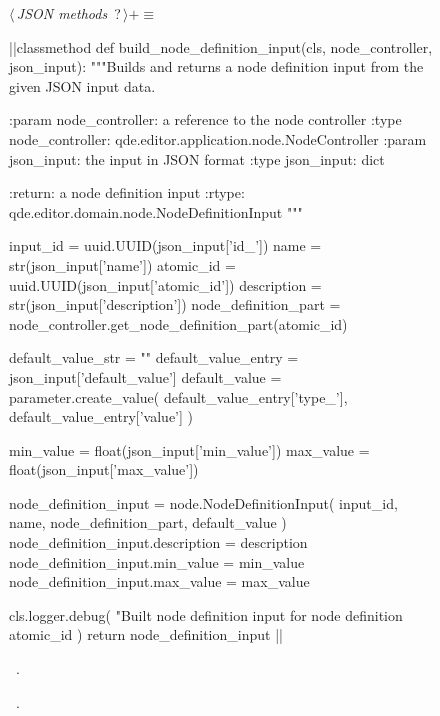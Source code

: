\documentclass[%
    a4paper,    %
    justified,  %
    nobib,      %
    openany     %
]{tufte-book}
\begin{document}
\begin{figure}
\begin{flushleft} \small
\begin{minipage}{\linewidth}\label{scrap127}\raggedright\small
{} $\langle\,${\itshape JSON methods}\nobreak\ {\footnotesize {?}}$\,\rangle+\equiv$
\vspace{-1ex}
\begin{pythoncode}
|\normalfont{}\fontfamily{}|classmethod
def build_node_definition_input(cls, node_controller, json_input):
    """Builds and returns a node definition input from the given JSON input
    data.

    :param node_controller: a reference to the node controller
    :type  node_controller: qde.editor.application.node.NodeController
    :param json_input: the input in JSON format
    :type  json_input: dict

    :return: a node definition input
    :rtype:  qde.editor.domain.node.NodeDefinitionInput
    """

    input_id             = uuid.UUID(json_input['id_'])
    name                 = str(json_input['name'])
    atomic_id            = uuid.UUID(json_input['atomic_id'])
    description          = str(json_input['description'])
    node_definition_part = node_controller.get_node_definition_part(atomic_id)

    default_value_str = ""
    default_value_entry = json_input['default_value']
    default_value = parameter.create_value(
        default_value_entry['type_'],
        default_value_entry['value']
    )

    min_value = float(json_input['min_value'])
    max_value = float(json_input['max_value'])

    node_definition_input = node.NodeDefinitionInput(
        input_id,
        name,
        node_definition_part,
        default_value
    )
    node_definition_input.description = description
    node_definition_input.min_value = min_value
    node_definition_input.max_value = max_value

    cls.logger.debug(
        "Built node definition input for node definition %
        atomic_id
    )
    return node_definition_input
|\NWsep|
\end{pythoncode}
\vspace{1.5ex}
\footnotesize
\begin{list}{}{\setlength{\itemsep}{-\parsep}\setlength{\itemindent}{-\leftmargin}}
\item \NWtxtMacroDefBy\ .
\item \NWtxtMacroRefIn\ .


\end{list}
\end{minipage}
\end{flushleft}
\end{figure}
\end{document}
